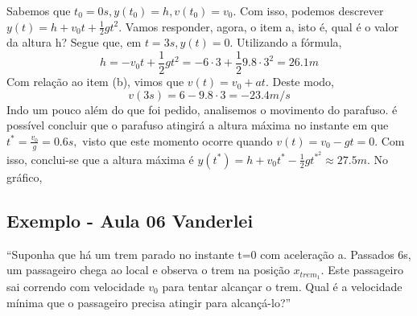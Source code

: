 \documentclass[PhysicsI/physics_notes.tex]{subfiles}
\begin{document}
Sabemos que $t_{0} = 0s, y(t_{0}) = h, v(t_{0}) = v_{0}.$ Com isso, podemos descrever $y(t) = h + v_{0}t + \frac{1}{2}gt^{2}$. Vamos responder, agora, o item a, isto é, qual é o valor
da altura h? Segue que, em $t=3s, y(t) = 0$. Utilizando a fórmula,
$$
	h = -v_{0}t + \frac{1}{2}gt^{2} = -6 \cdot3 + \frac{1}{2}9.8 \cdot 3^{2} = 26.1m
$$
Com relação ao item (b), vimos que $v(t) = v_{0} + at.$ Deste modo,
$$
	v(3s) = 6 - 9.8 \cdot 3 = -23.4m/s
$$
Indo um pouco além do que foi pedido, analisemos o movimento do parafuso. é possível concluir que o parafuso atingirá a altura
máxima no instante em que $t^{*} = \frac{v_{0}}{g} = 0.6s,$ visto que este momento ocorre quando $v(t) = v_{0} - gt = 0$. Com isso,
conclui-se que a altura máxima é $y(t^{*}) = h + v_{0}t^{*} - \frac{1}{2}gt^{*^{2}} \approx 27.5m.$ No gráfico,
\begin{center}
\end{center}

\subsection{Exemplo - Aula 06 Vanderlei}
``Suponha que há um trem parado no instante t=0 com aceleração a. Passados 6s, um passageiro chega ao local e observa o trem na posição $x_{trem_{1}}$.
Este passageiro sai correndo com velocidade $v_{0}$ para tentar alcançar o trem. Qual é a velocidade mínima que o passageiro precisa atingir
para alcançá-lo?''
\end{document}
